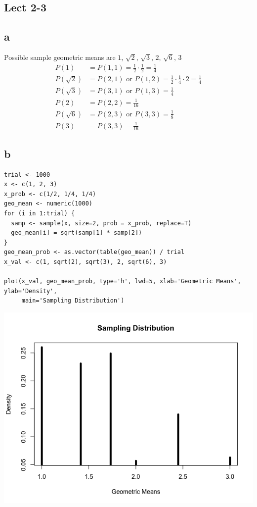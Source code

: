 \documentclass[11pt,letterpaper]{article}
\begin{document}
\subsection*{Lect 2-3}
\subsection*{a}
Possible sample geometric means are $1$, $\sqrt{2}$, $\sqrt{3}$, $2$, $\sqrt{6}$, $3$\\
\begin{align*}
P(1) &= P(1, 1) =  \frac{1}{2} \cdot \frac{1}{2} = \frac{1}{4} \\
P(\sqrt{2}) &= P(2, 1) \text{ or } P(1,2)=  \frac{1}{2} \cdot \frac{1}{4} \cdot 2 = \frac{1}{4} \\
P(\sqrt{3}) &= P(3,1) \text{ or } P(1,3) = \frac{1}{4} \\
P(2) &= P(2, 2) = \frac{1}{16} \\
P(\sqrt{6}) &= P(2, 3) \text{ or } P(3, 3) = \frac{1}{8} \\
P(3) &= P(3,3) =  \frac{1}{16}
\end{align*}

\subsection*{b}
\begin{verbatim}
trial <- 1000
x <- c(1, 2, 3)
x_prob <- c(1/2, 1/4, 1/4)
geo_mean <- numeric(1000)
for (i in 1:trial) {
  samp <- sample(x, size=2, prob = x_prob, replace=T)
  geo_mean[i] = sqrt(samp[1] * samp[2])
}
geo_mean_prob <- as.vector(table(geo_mean)) / trial
x_val <- c(1, sqrt(2), sqrt(3), 2, sqrt(6), 3)

plot(x_val, geo_mean_prob, type='h', lwd=5, xlab='Geometric Means', ylab='Density',
     main='Sampling Distribution')
\end{verbatim}
\includegraphics[scale=0.45]{lec-2-3-b.png}
\end{document}
